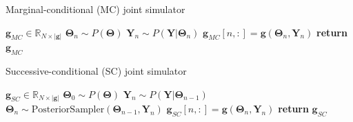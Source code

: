 \documentclass[a4paper,11pt]{article}
\begin{document}
\begin{algorithm}
    \centering
    \caption{Marginal-conditional (MC) joint simulator}\label{alg:mc-sampler}
    \begin{algorithmic}[1]
        \State {} $\mathbf{g}_{MC} \in \mathbb{R}_{N\times |\mathbf{g}|}$
            \State $\mathbf{\Theta}_{n} \sim P(\mathbf{\Theta})$ 
            \State $\mathbf{Y}_{n} \sim P(\mathbf{Y}|\mathbf{\Theta}_{n})$ 
            \State $\mathbf{g}_{MC}[n, :] = \mathbf{g}(\mathbf{\Theta}_{n}, \mathbf{Y}_{n})$ 
        \EndFor        
        \State \textbf{return} $\mathbf{g}_{MC}$
    \end{algorithmic}
\end{algorithm}

\begin{algorithm}
    \centering
    \caption{Successive-conditional (SC) joint simulator}\label{alg:sc-sampler}
    \begin{algorithmic}[1]
        \State {} $\mathbf{g}_{SC} \in \mathbb{R}_{N\times |\mathbf{g}|}$
        \State $\mathbf{\Theta}_{0} \sim P(\mathbf{\Theta})$ 
            \State $\mathbf{Y}_{n} \sim P(\mathbf{Y}|\mathbf{\Theta}_{n-1})$ 
            \State $\mathbf{\Theta}_{n} \sim \text{PosteriorSampler}(\mathbf{\Theta}_{n-1}, \mathbf{Y}_{n})$ 
            \State $\mathbf{g}_{SC}[n, :] = \mathbf{g}(\mathbf{\Theta}_{n}, \mathbf{Y}_{n})$ 
        \EndFor        
        \State \textbf{return} $\mathbf{g}_{SC}$
    \end{algorithmic}
\end{algorithm}
\end{document}
